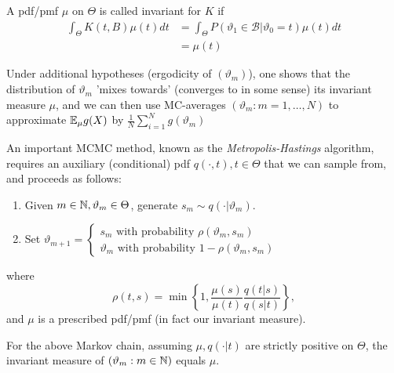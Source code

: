 \documentclass[a4paper]{article}
\begin{document}
A pdf/pmf  $\mu$ on $\Theta$ is called invariant for $K$ if
\begin{align*}
	\int_{\Theta} K(t,B) \mu(t) dt &= \int_{\Theta} P\left( \vartheta_1 \in \mathcal{B} | \vartheta_0 = t \right) \mu(t) dt \\
	&= \mu(t)
\end{align*}

Under additional hypotheses (ergodicity of $(\vartheta_m)$), one shows that the distribution of  $\vartheta_m$ 'mixes towards' (converges to in some sense) its invariant measure $\mu$, and we can then use MC-averages $(\vartheta_m : m=1,\ldots,N)$ to approximate $\mathbb{E}_{\mu} g(X)$ by $\frac{1}{N} \sum_{i=1}^{N}g(\vartheta_m)$

An important MCMC method, known as the \textit{Metropolis-Hastings} algorithm, requires an auxiliary (conditional) pdf $q(\cdot , t), t\in \Theta$ that we can sample from, and proceeds as follows:
\begin{enumerate}
	\item Given $m\in \mathbb{N}, \vartheta_m \in \Theta$, generate $s_m \sim q(\cdot |\vartheta_m)$.
	\item Set $\vartheta_{m+1} = \begin{cases}
			s_m \text{ with probability } \rho(\vartheta_m, s_m) \\
			\vartheta_m \text{ with probability } 1 - \rho(\vartheta_m, s_m)
	\end{cases}$ 
\end{enumerate}
where
\[         
	\rho(t,s) = \min\left\{ 1,  \frac{\mu(s)}{\mu(t)} \frac{q(t|s)}{q(s|t)} \right\} 
,\]        
and $\mu$ is a prescribed pdf/pmf (in fact our invariant measure).

\begin{prop}
	For the above Markov chain, assuming $\mu, q(\cdot |t)$ are strictly positive on $\Theta$, the invariant measure of $(\vartheta_m : m \in \mathbb{N})$ equals $\mu$.
\end{prop}
\end{document}
